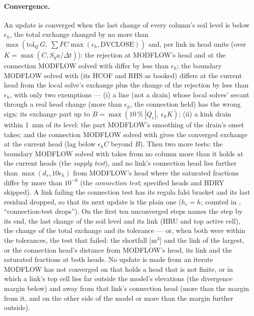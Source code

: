 \paragraph{Convergence.} An update is converged when the last change of every column's soil level is below $\epsilon_h$,
the total exchange changed by no more than $\max(\mathrm{tol}_Q\,G,\ \sum F C\max(\epsilon_h,\mathrm{DVCLOSE}))$ and, per link
in head units (over $K=\max(C,S_ya/\Delta t)$): the rejection at MODFLOW's head and at the connection MODFLOW solved with
differ by less than $\epsilon_h$; the boundary MODFLOW solved with (its HCOF and RHS as booked) differs at the current head
from the local solve's exchange plus the change of the rejection by less than $\epsilon_h$, with only two exemptions --- (i) a
line (not a drain) whose local solves' secant through a real head change (more than $\epsilon_h$, the connection held) has the
wrong sign: its exchange part up to $B=\max(10\,\%\ |Q_c|,\ \epsilon_hK)$; (ii) a kink drain within 1~mm of its level: the
part MODFLOW's smoothing of the drain's onset takes; and the connection MODFLOW solved with gives the converged exchange at
the current head (lag below $\epsilon_hC$ beyond $B$). Then two more tests: the boundary MODFLOW solved with takes from no
column more than it holds at the current heads (the \emph{supply test}), and no link's connection head lies further than
$\max(d_s,10\epsilon_h)$ from MODFLOW's head where the saturated fractions differ by more than $10^{-6}$ (the
\emph{connection test}; specified heads and HDRY skipped). A link failing the connection test has its regula falsi bracket
and its last residual dropped, so that its next update is the plain one ($h_c=h$; counted in ,
``connection-test drops''). On the first ten unconverged steps  names the step by its end, the last
change of the soil level and its link (HRU and top active cell), the change of the total exchange and its tolerance --- or,
when both were within the tolerances, the test that failed: the shortfall [m$^3$] and the link of the largest, or the
connection head's distance from MODFLOW's head, its link and the saturated fractions at both heads. No update is made from an
iterate MODFLOW has not converged on that holds a head that is not finite, or in which a link's top cell lies far outside the
model's elevations (the divergence margin below) and away from that link's connection head (more than the margin from it,
and on the other side of the model or more than the margin further outside).

